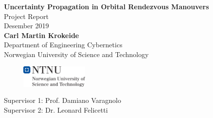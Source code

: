 \documentclass[a4paper]{article}
\begin{document}
\begin{titlepage}
\begin{center}
\Large \textbf{Uncertainty Propagation in Orbital Rendezvous Manouvers} \\
\vspace{0.25cm}
\large Project Report \\
\vspace{0.75cm}
\large Desember 2019 \\
\vspace{0.75cm}
\large \textbf{Carl Martin Krokeide} \\
\vspace{0.1cm}
 Department of Engineering Cybernetics \\
\vspace{0.1cm}
 Norwegian University of Science and Technology \\
\vspace{1.25cm}
\end{center}
\end{titlepage}





\begin{figure}
    \centering
    \includegraphics[width=0.3\textwidth]{hovedlogo_eng.png}
\end{figure}

\vspace{\fill}
\large{Supervisor 1: Prof. Damiano Varagnolo \\
Supervisor 2: Dr. Leonard Felicetti} 

\begin{figure}
\end{figure}


\newpage

\tableofcontents 

\newpage



\newpage



\newpage



\newpage



\newpage



\newpage



\newpage

\printbibliography[heading=bibintoc,title={References}]

\newpage

\appendix
\appendixpage
\addappheadtotoc
\end{document}
